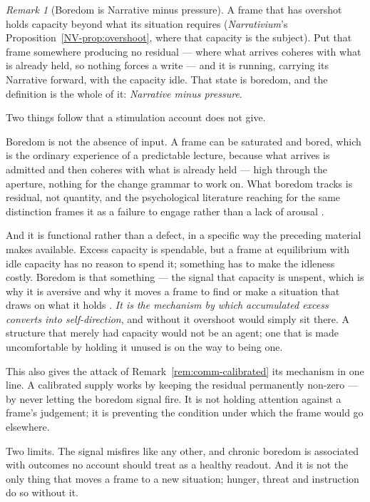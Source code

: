 \documentclass[11pt,a4paper]{article}
\theoremstyle{remark}\newtheorem{remark}[definition]{Remark}
\begin{document}
\begin{remark}[Boredom is Narrative minus pressure]\label{rem:boredom}
A frame that has overshot holds capacity beyond what its situation requires
(\emph{Narrativium}'s Proposition~\ref{NV-prop:overshoot}, where that capacity is the
subject). Put that frame somewhere producing no residual --- where what arrives coheres with
what is already held, so nothing forces a write --- and it is running, carrying its Narrative
forward, with the capacity idle. That state is boredom, and the definition is the whole of it:
\emph{Narrative minus pressure}.

Two things follow that a stimulation account does not give.

Boredom is not the absence of input. A frame can be saturated and bored, which is the ordinary
experience of a predictable lecture, because what arrives is admitted and then coheres with what is
already held --- high through the aperture, nothing for the change grammar to work on. What boredom
tracks is residual, not quantity, and the psychological literature reaching for the same distinction
frames it as a failure to engage rather than a lack of arousal \citep{eastwood2012}.

And it is functional rather than a defect, in a specific way the preceding material makes available.
Excess capacity is spendable, but a frame at equilibrium with idle capacity has no reason to spend
it; something has to make the idleness costly. Boredom is that something --- the signal that capacity
is unspent, which is why it is aversive and why it moves a frame to find or make a situation that
draws on what it holds \citep{benchlench2013}. \emph{It is the mechanism by which accumulated excess
converts into self-direction}, and without it overshoot would simply sit there. A structure that
merely had capacity would not be an agent; one that is made uncomfortable by holding it unused is on
the way to being one.

This also gives the attack of Remark~\ref{rem:comm-calibrated} its mechanism in one line. A
calibrated supply works by keeping the residual permanently non-zero --- by never letting the
boredom signal fire. It is not holding attention against a frame's judgement; it is preventing the
condition under which the frame would go elsewhere.

Two limits. The signal misfires like any other, and chronic boredom is associated with outcomes no
account should treat as a healthy readout. And it is not the only thing that moves a frame to a new
situation; hunger, threat and instruction do so without it.
\end{remark}
\end{document}
